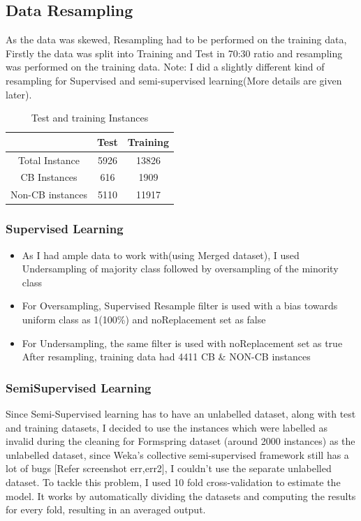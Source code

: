 \documentclass[10pt,conference]{IEEEtran}
\begin{document}
\subsection{Data Resampling}
As the data was skewed, Resampling had to be performed on the training data, Firstly the data was split into Training and Test in 70:30 ratio and resampling was performed on the training data. Note: I did a slightly different kind of resampling for Supervised and semi-supervised learning(More details are given later).
\begin{table}[]
    \caption{Test and training Instances}
    \centering
    \begin{tabular}{|c|c|c|}
    \hline
         & Test & Training \\
    \hline
    Total Instance & 5926 & 13826 \\
    \hline
    CB Instances & 616 &1909 \\
    \hline
    Non-CB instances & 5110 & 11917 \\
    \hline
    \end{tabular}
    \label{tab:my_label}
\end{table}

\subsubsection{Supervised Learning}
\begin{itemize}
    \item As I had ample data to work with(using Merged dataset), I used Undersampling of majority class followed by oversampling of the minority class
    \item For Oversampling, Supervised Resample filter is used with a bias towards uniform class as 1(100\%) and noReplacement set as false
    \item For Undersampling, the same filter is used with noReplacement set as true
    \\
    
	After resampling, training data had 4411 CB \& NON-CB instances

\end{itemize}

\subsubsection{SemiSupervised Learning}
Since Semi-Supervised learning has to have an unlabelled dataset, along with test and training datasets, I decided to use the instances which were labelled as invalid during the cleaning for Formspring dataset (around 2000 instances) as the unlabelled dataset, since Weka’s collective semi-supervised framework still has a lot of bugs [Refer screenshot err,err2], I couldn’t use the separate unlabelled dataset. To tackle this problem, I used 10 fold cross-validation to estimate the model. It works by automatically dividing the datasets and computing the results for every fold, resulting in an averaged output.
\end{document}
